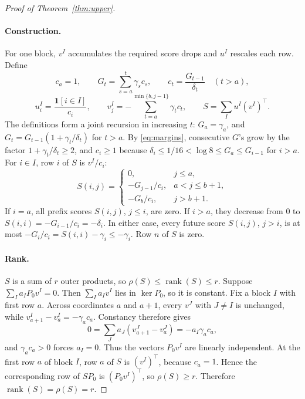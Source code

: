 \documentclass[10pt]{article} %
\theoremstyle{definition}
\DeclareMathOperator{\rank}{rank}
\begin{document}
\begin{proof}[Proof of Theorem~\ref{thm:upper}]
\paragraph{Construction.}
For one block, \(v^I\) accumulates the required score drops and \(u^I\)
rescales each row.  Define
\[
 c_a=1,\qquad G_t=\sum_{s=a}^{t}\gamma_sc_s,\qquad
 c_t=\frac{G_{t-1}}{\delta_t}\quad(t>a),
\]
\[
 u_i^I=\frac{\mathbf1[i\in I]}{c_i},\qquad
 v_j^I=-\sum_{t=a}^{\min\{b,j-1\}}\gamma_tc_t,
\qquad
 S=\sum_Iu^I(v^I)^\top .
\]
The definitions form a joint recursion in increasing \(t\):
\(G_a=\gamma_a\), and \(G_t=G_{t-1}(1+\gamma_t/\delta_t)\) for \(t>a\).
By \eqref{eq:margins}, consecutive \(G\)'s grow by the factor
\(1+\gamma_t/\delta_t\ge2\), and \(c_i\ge1\) because
\(\delta_i\le1/16<\log8\le G_a\le G_{i-1}\) for \(i>a\).  For \(i\in I\),
row \(i\) of \(S\) is \(v^I/c_i\):
\[
 S(i,j)=
 \begin{cases}
  0,&j\le a,\\
  -G_{j-1}/c_i,&a<j\le b+1,\\
  -G_b/c_i,&j>b+1 .
 \end{cases}
\]
If \(i=a\), all prefix scores \(S(i,j)\), \(j\le i\), are zero.  If
\(i>a\), they decrease from \(0\) to
\(S(i,i)=-G_{i-1}/c_i=-\delta_i\).  In either case, every future score
\(S(i,j)\), \(j>i\), is at most
\(-G_i/c_i=S(i,i)-\gamma_i\le-\gamma_i\).  Row \(n\) of \(S\) is zero.

\paragraph{Rank.}
\(S\) is a sum of \(r\) outer products, so \(\rho(S)\le\rank(S)\le r\).
Suppose \(\sum_Ia_IP_0v^I=0\).  Then \(\sum_Ia_Iv^I\) lies in \(\ker P_0\),
so it is constant.  Fix a block \(I\) with first row \(a\).  Across
coordinates \(a\) and \(a+1\), every \(v^J\) with \(J\ne I\) is unchanged,
while \(v^I_{a+1}-v^I_a=-\gamma_ac_a\).  Constancy therefore gives
\[
 0=\sum_Ja_J(v^J_{a+1}-v^J_a)=-a_I\gamma_ac_a,
\]
and \(\gamma_ac_a>0\) forces \(a_I=0\).  Thus the vectors \(P_0v^I\) are
linearly independent.  At the first row \(a\) of block \(I\), row \(a\) of
\(S\) is \((v^I)^\top\), because \(c_a=1\).  Hence the corresponding row of
\(SP_0\) is \((P_0v^I)^\top\), so \(\rho(S)\ge r\).  Therefore
\(\rank(S)=\rho(S)=r\).


\end{proof}
\end{document}
